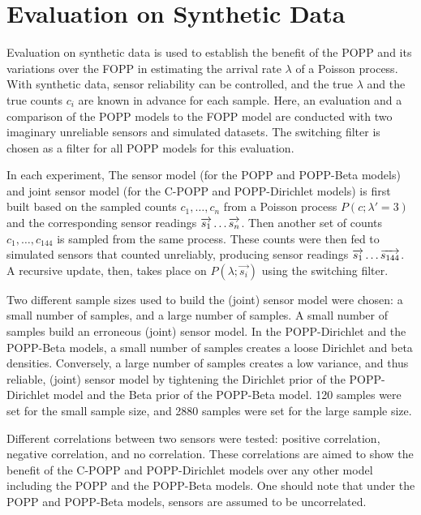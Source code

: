 \section{Evaluation on Synthetic Data}
\label{sec:evasim}

Evaluation on synthetic data is used to establish the benefit of the POPP and its variations over the FOPP in estimating the arrival rate $\lambda$ of a Poisson process. With synthetic data, sensor reliability can be controlled, and the true $\lambda$ and the true counts $c_i$ are known in advance for each sample. Here, an evaluation and a comparison of the POPP models to the FOPP model are conducted with two imaginary unreliable sensors and simulated datasets. The switching filter is chosen as a filter for all POPP models for this evaluation.

In each experiment, The sensor model (for the POPP and POPP-Beta models) and joint sensor model (for the C-POPP and POPP-Dirichlet models) is first built based on the sampled counts $c_1, \ldots, c_n$ from a Poisson process $P(c ; \lambda'=3)$ and the corresponding sensor readings $\protect\overrightarrow{s_1} \ldots \protect\overrightarrow{s_{n}}$. Then another set of counts $c_1, \ldots, c_{144}$ is sampled from the same process. These counts were then fed to simulated sensors that counted unreliably, producing sensor readings $\protect\overrightarrow{s_1} \ldots \protect\overrightarrow{s_{144}}$. A recursive update, then, takes place on $P(\lambda ; \overrightarrow{s_i})$ using the switching filter.

Two different sample sizes used to build the (joint) sensor model were chosen: a small number of samples, and a large number of samples. A small number of samples build an erroneous (joint) sensor model. In the POPP-Dirichlet and the POPP-Beta models, a small number of samples creates a loose Dirichlet and beta densities. Conversely, a large number of samples creates a low variance, and thus reliable, (joint) sensor model by tightening the Dirichlet prior of the POPP-Dirichlet model and the Beta prior of the POPP-Beta model. 120 samples were set for the small sample size, and 2880 samples were set for the large sample size.

Different correlations between two sensors were tested: positive correlation, negative correlation, and no correlation. These correlations are aimed to show the benefit of the C-POPP and POPP-Dirichlet models over any other model including the POPP and the POPP-Beta models. One should note that under the POPP and POPP-Beta models, sensors are assumed to be uncorrelated.  

